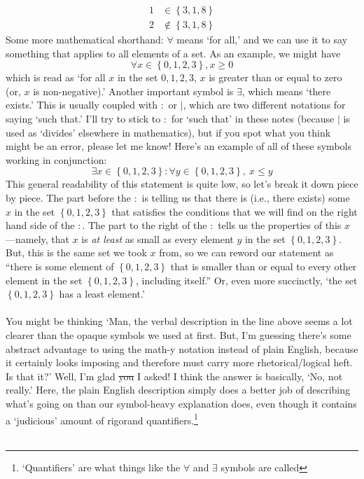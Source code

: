 \documentclass[10pt]{article}
\theoremstyle{definition}
\newcommand{\set}[1]{\left\{ #1 \right\}}
\begin{document}
\begin{align*}
1&\in\set{3,1,8}\\
2&\notin\set{3,1,8}
\end{align*}
Some more mathematical shorthand: $\forall$ means `for all,' and we can use it to say something that applies to all elements of a set.  As an example, we might have
\[\forall x\in \set{0,1,2,3}, x\geq 0\]
which is read as `for all $x$ in the set ${0,1,2,3}$, $x$ is greater than or equal to zero (or, $x$ is non-negative).'  Another important symbol is $\exists$, which means `there exists.'  This is usually coupled with $:$ or $|$, which are two different notations for saying `such that.'  I'll try to stick to $:$ for `such that' in these notes (because $|$ is used as `divides' elsewhere in mathematics), but if you spot what you think might be an error, please let me know!  Here's an example of all of these symbols working in conjunction:
\[\exists x\in \set{0,1,2,3} : \forall y\in\set{0,1,2,3},~x\leq y\]
This general readability of this statement is quite low, so let's break it down piece by piece.  The part before the $:$ is telling us that there is (i.e., there exists) some $x$ in the set $\set{0,1,2,3}$ that satisfies the conditions that we will find on the right hand side of the $:$.  The part to the right of the $:$ tells us the properties of this $x$---namely, that $x$ is \emph{at least} as small as every element $y$ in the set $\set{0,1,2,3}$.  But, this is the same set we took $x$ from, so we can reword our statement as ``there is some element of $\set{0,1,2,3}$ that is smaller than or equal to every other element in the set $\set{0,1,2,3}$, including itself.''  Or, even more succinctly, `the set $\set{0,1,2,3}$ has a least element.'  \\~\\
You might be thinking `Man, the verbal description in the line above seems a lot clearer than the opaque symbols we used at first.  But, I'm guessing there's some abstract advantage to using the math-y notation instead of plain English, because it certainly looks imposing and therefore must carry more rhetorical/logical heft.  Is that it?'  Well, I'm glad \sout{you} I asked!  I think the answer is basically, `No, not really.'  Here, the plain English description simply does a better job of describing what's going on than our symbol-heavy explanation does, even though it contains a `judicious' amount of rigor\texttrademark and quantifiers.\footnote{`Quantifiers' are what things like the $\forall$ and $\exists$ symbols are called}  \\~\\
\end{document}
